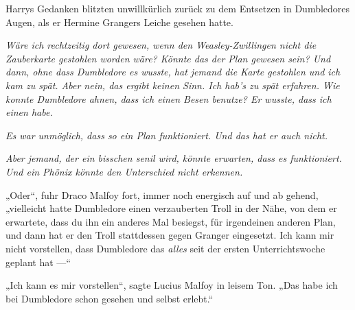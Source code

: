 Harrys Gedanken blitzten unwillkürlich zurück zu dem Entsetzen in Dumbledores Augen, als er Hermine Grangers Leiche gesehen hatte.

\emph{Wäre ich rechtzeitig dort gewesen, wenn den Weasley-Zwillingen nicht die Zauberkarte gestohlen worden wäre? Könnte das der Plan gewesen sein? Und dann, ohne dass Dumbledore es wusste, hat jemand die Karte gestohlen und ich kam zu spät. Aber nein, das ergibt keinen Sinn. Ich hab’s zu spät erfahren. Wie konnte Dumbledore ahnen, dass ich einen Besen benutze? Er wusste, dass ich einen habe.}


\emph{Es war unmöglich, dass so ein Plan funktioniert. Und das hat er auch nicht.}

\emph{Aber jemand, der ein bisschen senil wird, könnte \emph{erwarten}, dass es funktioniert. Und ein Phönix könnte den Unterschied nicht erkennen.}

„Oder“, fuhr Draco Malfoy fort, immer noch energisch auf und ab gehend, „vielleicht hatte Dumbledore einen verzauberten Troll in der Nähe, von dem er erwartete, dass du ihn ein anderes Mal besiegst, für irgendeinen anderen Plan, und dann hat er den Troll stattdessen gegen Granger eingesetzt. Ich kann mir nicht vorstellen, dass Dumbledore das \emph{alles} seit der ersten Unterrichtswoche geplant hat —“

„Ich kann es mir vorstellen“, sagte Lucius Malfoy in leisem Ton.
„Das habe ich bei Dumbledore schon gesehen und selbst erlebt.“

